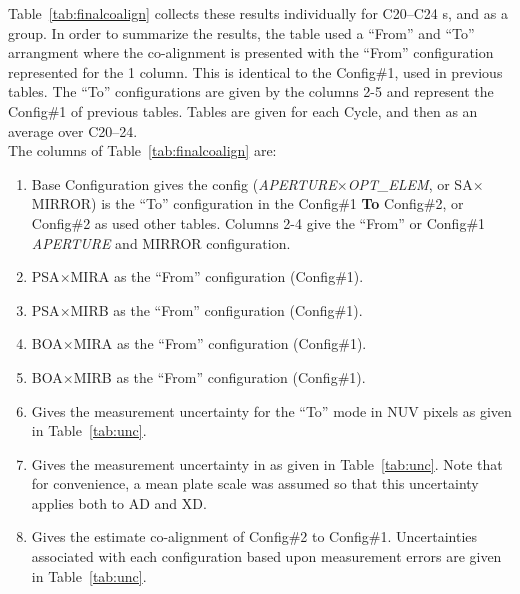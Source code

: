 Table~\ref{tab:finalcoalign} collects these results individually for C20--C24 s, and as a group.
In order to summarize the results, the table used a ``From'' and ``To'' arrangment where the co-alignment is presented
with the ``From''  configuration represented for the 1 column. This is identical to the Config\#1,
 used in previous tables. The ``To'' configurations are given by the columns 2-5 and represent the Config\#1 of previous tables.
Tables are given for each Cycle, and then as an average over C20--24. \\

The columns of Table~\ref{tab:finalcoalign} are:
\footnotesize
\begin{enumerate}
\item Base Configuration gives the config (\textit{APERTURE}$\times$\textit{OPT\_ELEM}, or SA$\times$MIRROR) is the ``To'' configuration in the Config\#1 {\bf To} Config\#2, or
Config\#2 as used other tables. Columns 2-4 give the ``From'' or Config\#1  \textit{APERTURE} and MIRROR configuration.
\item PSA$\times$MIRA as the ``From'' configuration (Config\#1).
\item PSA$\times$MIRB as the ``From'' configuration (Config\#1).
\item BOA$\times$MIRA as the ``From'' configuration (Config\#1).
\item BOA$\times$MIRB as the ``From'' configuration (Config\#1).
\item Gives the measurement uncertainty for the ``To'' mode in NUV pixels as given in Table~\ref{tab:unc}.
\item Gives the measurement uncertainty in \arcsec{} as given in Table~\ref{tab:unc}.
Note that for convenience, a mean plate scale was assumed so that this uncertainty applies both to AD and XD.
\item Gives the estimate co-alignment of Config\#2 to Config\#1. Uncertainties associated with each  configuration based upon measurement errors are given in Table~\ref{tab:unc}.
\end{enumerate}
\normalsize

